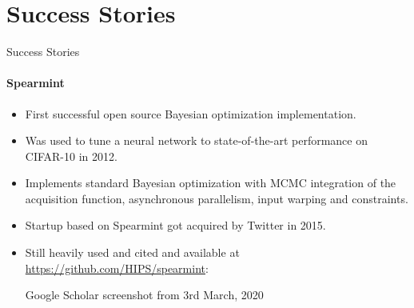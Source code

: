 \section{Success Stories}
\begin{frame}[c]{Success Stories}
\framesubtitle{Spearmint}

\small
\begin{itemize}
    \item First successful open source Bayesian optimization implementation.
    \item Was used to tune a neural network to state-of-the-art performance on CIFAR-10 in 2012.
    \item Implements standard Bayesian optimization with MCMC integration of the acquisition function, asynchronous parallelism, input warping and constraints.
    \item Startup based on Spearmint got acquired by Twitter in 2015.
    \item Still heavily used and cited and available at \url{https://github.com/HIPS/spearmint}:
    \begin{center}
        
        
        \newline Google Scholar screenshot from 3rd March, 2020
    \end{center}
\end{itemize}
\end{frame}

